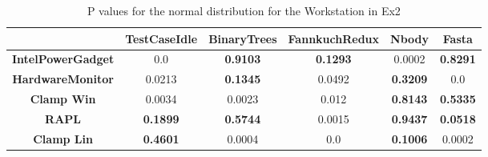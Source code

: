 \begin{table}[]
    \begin{tabular}{||c|c|c|c|c|c||}    \hline
    &\textbf{TestCaseIdle}&\textbf{BinaryTrees}&\textbf{FannkuchRedux}&\textbf{Nbody}&\textbf{Fasta}\\ [0.5ex] \hline
    \hline \textbf{IntelPowerGadget}&0.0&\textbf{0.9103}&\textbf{0.1293}&0.0002&\textbf{0.8291}\\
    \textbf{HardwareMonitor}&0.0213&\textbf{0.1345}&0.0492&\textbf{0.3209}&0.0\\
    \textbf{Clamp Win}&0.0034&0.0023&0.012&\textbf{0.8143}&\textbf{0.5335}\\
    \textbf{RAPL}&\textbf{0.1899}&\textbf{0.5744}&0.0015&\textbf{0.9437}&\textbf{0.0518}\\
    \textbf{Clamp Lin}&\textbf{0.4601}&0.0004&0.0&\textbf{0.1006}&0.0002\\ \hline \end{tabular}
    \caption{P values for the normal distribution for the Workstation in Ex2}\label{tab:NormDist2}
\end{table}